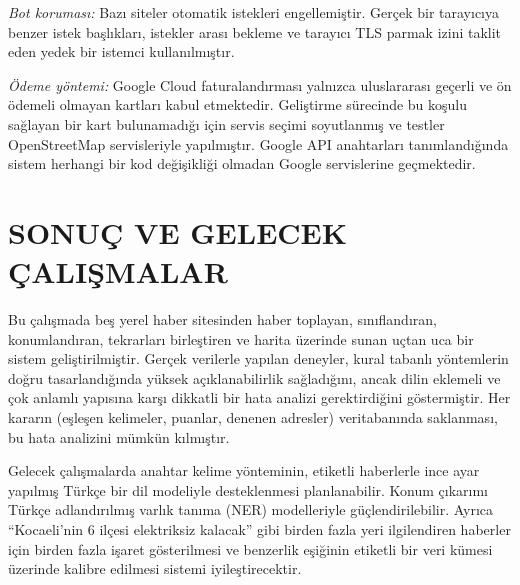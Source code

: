 \documentclass[conference,a4paper]{IEEEtran}
\begin{document}
\emph{Bot koruması:} Bazı siteler otomatik istekleri engellemiştir. Gerçek bir
tarayıcıya benzer istek başlıkları, istekler arası bekleme ve tarayıcı TLS parmak
izini taklit eden yedek bir istemci kullanılmıştır.

\emph{Ödeme yöntemi:} Google Cloud faturalandırması yalnızca uluslararası geçerli
ve ön ödemeli olmayan kartları kabul etmektedir. Geliştirme sürecinde bu koşulu
sağlayan bir kart bulunamadığı için servis seçimi soyutlanmış ve testler
OpenStreetMap servisleriyle yapılmıştır. Google API anahtarları tanımlandığında
sistem herhangi bir kod değişikliği olmadan Google servislerine geçmektedir.

\section{SONUÇ VE GELECEK ÇALIŞMALAR}\label{sec:sonuc}
Bu çalışmada beş yerel haber sitesinden haber toplayan, sınıflandıran, konumlandıran,
tekrarları birleştiren ve harita üzerinde sunan uçtan uca bir sistem
geliştirilmiştir. Gerçek verilerle yapılan deneyler, kural tabanlı yöntemlerin
doğru tasarlandığında yüksek açıklanabilirlik sağladığını, ancak dilin
eklemeli ve çok anlamlı yapısına karşı dikkatli bir hata analizi gerektirdiğini
göstermiştir. Her kararın (eşleşen kelimeler, puanlar, denenen adresler)
veritabanında saklanması, bu hata analizini mümkün kılmıştır.

Gelecek çalışmalarda anahtar kelime yönteminin, etiketli haberlerle ince ayar
yapılmış Türkçe bir dil modeliyle desteklenmesi planlanabilir. Konum çıkarımı
Türkçe adlandırılmış varlık tanıma (NER) modelleriyle güçlendirilebilir. Ayrıca
``Kocaeli'nin 6 ilçesi elektriksiz kalacak'' gibi birden fazla yeri ilgilendiren
haberler için birden fazla işaret gösterilmesi ve benzerlik eşiğinin etiketli bir
veri kümesi üzerinde kalibre edilmesi sistemi iyileştirecektir.
\end{document}
